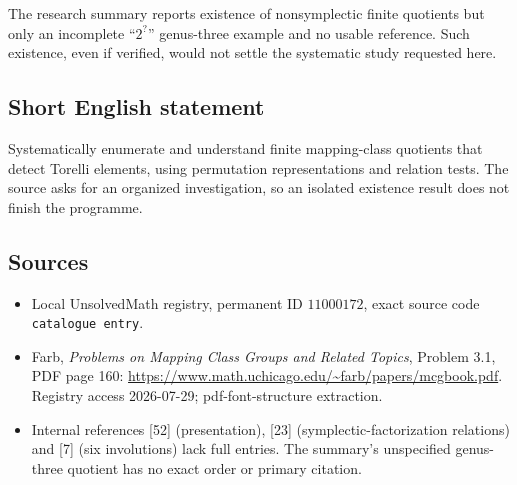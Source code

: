 \documentclass[11pt]{article}
\begin{document}
The research summary reports existence of nonsymplectic finite quotients but only an incomplete ``\(2^{?}\)'' genus-three example and no usable reference. Such existence, even if verified, would not settle the systematic study requested here.
\subsection{Short English statement}
Systematically enumerate and understand finite mapping-class quotients that detect Torelli elements, using permutation representations and relation tests. The source asks for an organized investigation, so an isolated existence result does not finish the programme.
\subsection{Sources}
\begin{itemize}
\item Local UnsolvedMath registry, permanent ID \(11000172\), exact source code \texttt{catalogue entry}.
\item Farb, \emph{Problems on Mapping Class Groups and Related Topics}, Problem 3.1, PDF page 160: \url{https://www.math.uchicago.edu/~farb/papers/mcgbook.pdf}. Registry access 2026-07-29; pdf-font-structure extraction.
\item Internal references [52] (presentation), [23] (symplectic-factorization relations) and [7] (six involutions) lack full entries. The summary's unspecified genus-three quotient has no exact order or primary citation.
\end{itemize}
\end{document}
